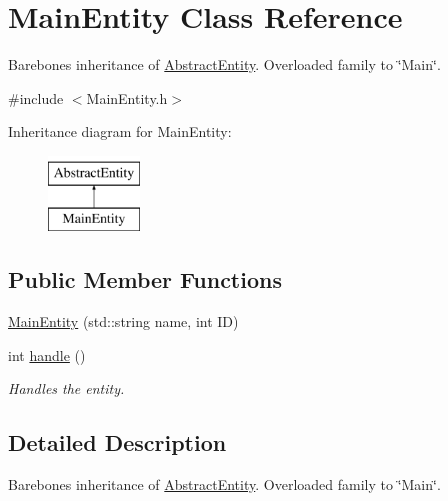 \hypertarget{class_main_entity}{\section{Main\-Entity Class Reference}
\label{d1/d6a/class_main_entity}
}


Barebones inheritance of \hyperlink{class_abstract_entity}{Abstract\-Entity}. Overloaded family to \char`\"{}\-Main\char`\"{}.  




{\ttfamily \#include $<$Main\-Entity.\-h$>$}

Inheritance diagram for Main\-Entity\-:\begin{figure}[H]
\begin{center}
\leavevmode
\includegraphics[height=2.000000cm]{d1/d6a/class_main_entity}
\end{center}
\end{figure}
\subsection*{Public Member Functions}
\begin{DoxyCompactItemize}
\item 
\hyperlink{class_main_entity_a1333a3fceed8e7370d1a4d921d3fd6b0}{Main\-Entity} (std\-::string name, int I\-D)
\item 
int \hyperlink{class_main_entity_ade561821779e704c48c019b4bc64d34c}{handle} ()
\begin{DoxyCompactList}\small\item\em Handles the entity. \end{DoxyCompactList}\end{DoxyCompactItemize}


\subsection{Detailed Description}
Barebones inheritance of \hyperlink{class_abstract_entity}{Abstract\-Entity}. Overloaded family to \char`\"{}\-Main\char`\"{}. 

